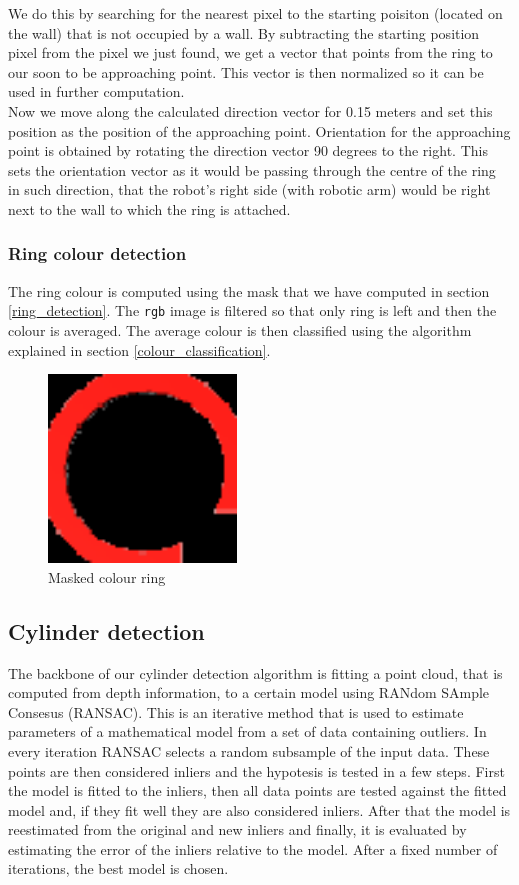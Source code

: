 \documentclass[12pt,a4paper]{article}
\begin{document}
	We do this by searching for the nearest pixel to the starting poisiton (located on the wall) that is not occupied by a wall. By subtracting the starting position pixel from the pixel we just found, we get a vector that points from the ring to our soon to be approaching point. This vector is then normalized so it can be used in further computation. \\

	Now we move along the calculated direction vector for 0.15 meters and set this position as the position of the approaching point. Orientation for the approaching point is obtained by rotating the direction vector 90 degrees to the right. This sets the orientation vector as it would be passing through the centre of the ring in such direction, that the robot's right side (with robotic arm) would be right next to the wall to which the ring is attached.

	\subsubsection{Ring colour detection}
	The ring colour is computed using the mask that we have computed in section \ref{ring_detection}. The \texttt{rgb} image is filtered so that only ring is left and then the colour is averaged. The average colour is then classified using the algorithm explained in section \ref{colour_classification}.
	
	\begin{figure}[h]
		\centering
		\includegraphics[height=5cm]{images/ring_detection_colour}
		\caption{Masked colour ring}
		\label{fig:masked_colour_ring}
	\end{figure}
		
	\subsection{Cylinder detection}
	The backbone of our cylinder detection algorithm is fitting a point cloud, that is computed from depth information, to a certain model using RANdom SAmple Consesus (RANSAC). This is an iterative method that is used to estimate parameters of a mathematical model from a set of data containing outliers. In every iteration RANSAC selects a random subsample of the input data. These points are then considered inliers and the hypotesis is tested in a few steps. First the model is fitted to the inliers, then all data points are tested against the fitted model and, if they fit well they are also considered inliers. After that the model is reestimated from the original and new inliers and finally, it is evaluated by estimating the error of the inliers relative to the model. After a fixed number of iterations, the best model is chosen. \\
\end{document}

